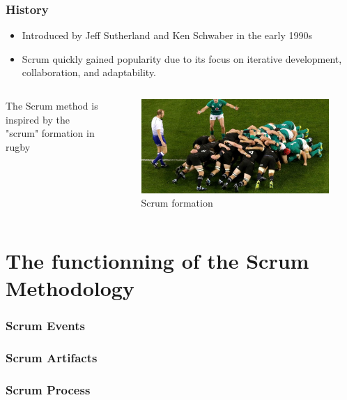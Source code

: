 \documentclass[
	11pt, %
]{beamer}
\begin{document}
\begin{frame}
	\frametitle{History}
	\begin{itemize}
		\item Introduced by Jeff Sutherland and Ken Schwaber  in the early 1990s
		\item  Scrum quickly gained popularity due to its focus on iterative development, collaboration, and adaptability.
	\end{itemize}
	\begin{columns}[c] %
		\begin{column}{0.45\textwidth} %
			The Scrum method is inspired by the "scrum" formation in rugby
		\end{column}
		\begin{column}{0.5\textwidth} %
			\begin{figure}
				\includegraphics[width=0.8\linewidth]{scrum.jpg}
				\caption{Scrum formation}
			\end{figure}
		\end{column}
	\end{columns}

\end{frame}


\section{The functionning of the Scrum Methodology}
\subsubsection{Scrum Events}
\subsubsection{Scrum Artifacts}
\subsubsection{Scrum Process}
\end{document}
